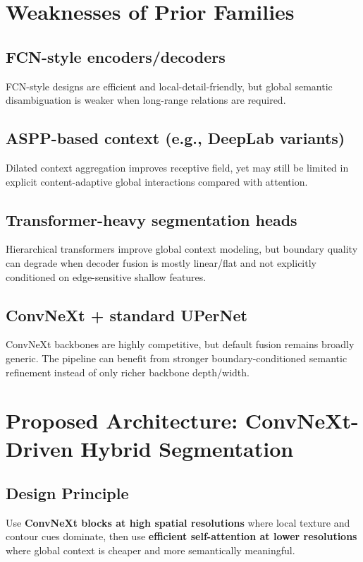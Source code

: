 \documentclass[11pt]{article}
\begin{document}
\section{Weaknesses of Prior Families}
\subsection{FCN-style encoders/decoders}
FCN-style designs are efficient and local-detail-friendly, but global semantic disambiguation is weaker when long-range relations are required.

\subsection{ASPP-based context (e.g., DeepLab variants)}
Dilated context aggregation improves receptive field, yet may still be limited in explicit content-adaptive global interactions compared with attention.

\subsection{Transformer-heavy segmentation heads}
Hierarchical transformers improve global context modeling, but boundary quality can degrade when decoder fusion is mostly linear/flat and not explicitly conditioned on edge-sensitive shallow features.

\subsection{ConvNeXt + standard UPerNet}
ConvNeXt backbones are highly competitive, but default fusion remains broadly generic. The pipeline can benefit from stronger boundary-conditioned semantic refinement instead of only richer backbone depth/width.

\section{Proposed Architecture: ConvNeXt-Driven Hybrid Segmentation}
\subsection{Design Principle}
Use \textbf{ConvNeXt blocks at high spatial resolutions} where local texture and contour cues dominate, then use \textbf{efficient self-attention at lower resolutions} where global context is cheaper and more semantically meaningful.
\end{document}
